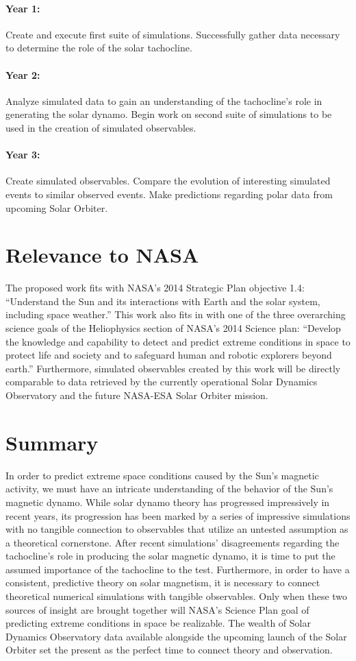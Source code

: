 \documentclass[aasms,12pt]{article}
\begin{document}
\paragraph{Year 1:}
Create and execute first suite of simulations.  Successfully gather data
necessary to determine the role of the solar tachocline.
\paragraph{Year 2:}
Analyze simulated data to gain an understanding of the tachocline's role in
generating the solar dynamo.  Begin work on second suite of simulations to be
used in the creation of simulated observables.
\paragraph{Year 3:}
Create simulated observables.  Compare the evolution of interesting simulated
events to similar observed events.  Make predictions regarding polar data from 
upcoming Solar Orbiter.

\section{Relevance to NASA} 
The proposed work fits with NASA's 2014 Strategic Plan objective
1.4:
``Understand the Sun and its interactions with Earth and the solar
system, including space weather.''
This work also fits in with one of the three overarching science goals
of the Heliophysics section of NASA's 2014 Science plan: 
``Develop the
knowledge and capability to detect and predict extreme conditions in space to
protect life and society and to safeguard human and robotic explorers beyond
earth.''  Furthermore, simulated observables created by this work will be
directly comparable to data retrieved by the currently operational Solar
Dynamics Observatory and the future NASA-ESA Solar Orbiter mission.

\section{Summary}
In order to predict extreme space conditions caused by the Sun's magnetic
activity, we must have an intricate understanding of the behavior of the Sun's
magnetic dynamo.  While solar dynamo theory has progressed impressively in
recent years, its progression has been marked by
a series of impressive simulations with no tangible connection to
observables that utilize an untested assumption as a theoretical cornerstone.
After recent simulations' disagreements regarding the 
tachocline's role in producing the solar magnetic dynamo, it is time
to put the assumed importance of the tachocline to the test.  Furthermore,
in order to have a
consistent, predictive theory on solar magnetism, it
is necessary to connect theoretical numerical simulations with tangible 
observables.  Only when these two sources of insight are brought together
will NASA's Science Plan goal of predicting extreme conditions in space
be realizable.  The wealth of Solar Dynamics
Observatory data available alongside the upcoming launch of the Solar Orbiter
set the present as the perfect time to connect theory and observation. 
\end{document}
